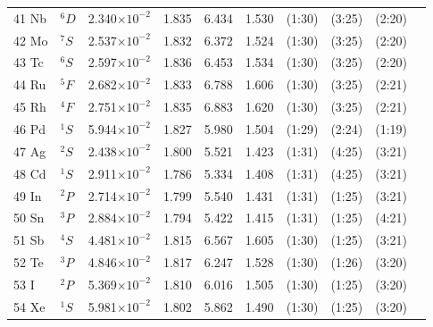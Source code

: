 \begin{longtable}{l l r r r r r r r r}
41 Nb 	&  	$^{6}D$   	&   	2.340$\times10^{-2}$   	&    	1.835    	&    	6.434    	&    	1.530    	&    	(1:30)    	&    	(3:25)    	&    	(2:20)   \\
42 Mo 	&  	$^{7}S$   	&   	2.537$\times10^{-2}$   	&    	1.832    	&    	6.372    	&    	1.524    	&    	(1:30)    	&    	(3:25)    	&    	(2:20)   \\
43 Tc 	&  	$^{6}S$   	&   	2.597$\times10^{-2}$   	&    	1.836    	&    	6.453    	&    	1.534    	&    	(1:30)    	&    	(3:25)    	&    	(2:20)   \\
44 Ru 	&  	$^{5}F$   	&   	2.682$\times10^{-2}$   	&    	1.833    	&    	6.788    	&    	1.606    	&    	(1:30)    	&    	(3:25)    	&    	(2:21)   \\
45 Rh 	&  	$^{4}F$   	&   	2.751$\times10^{-2}$   	&    	1.835    	&    	6.883    	&    	1.620    	&    	(1:30)    	&    	(3:25)    	&    	(2:21)   \\
46 Pd 	&  	$^{1}S$   	&   	5.944$\times10^{-2}$   	&    	1.827    	&    	5.980    	&    	1.504    	&    	(1:29)    	&    	(2:24)    	&    	(1:19)   \\
47 Ag 	&  	$^{2}S$   	&   	2.438$\times10^{-2}$   	&    	1.800    	&    	5.521    	&    	1.423    	&    	(1:31)    	&    	(4:25)    	&    	(3:21)   \\
48 Cd 	&  	$^{1}S$   	&   	2.911$\times10^{-2}$   	&   	1.786   	&   	5.334   	&   	1.408   	&   	(1:31)   	&    	(4:25)    	&    	(3:21)   \\
49 In 	&  	$^{2}P$   	&   	2.714$\times10^{-2}$   	&    	1.799    	&    	5.540    	&    	1.431    	&    	(1:31)    	&    	(1:25)    	&    	(3:21)   \\
50 Sn 	&  	$^{3}P$   	&   	2.884$\times10^{-2}$   	&    	1.794    	&    	5.422    	&    	1.415    	&    	(1:31)    	&    	(1:25)    	&    	(4:21)   \\
51 Sb 	&  	$^{4}S$   	&   	4.481$\times10^{-2}$   	&    	1.815    	&    	6.567    	&    	1.605    	&    	(1:30)    	&   	(1:25)   	&    	(3:21)   \\
52 Te 	&  	$^{3}P$   	&   	4.846$\times10^{-2}$   	&    	1.817    	&    	6.247    	&    	1.528    	&    	(1:30)    	&    	(1:26)    	&    	(3:20)   \\
53 I 		&  	$^{2}P$   	&   	5.369$\times10^{-2}$   	&    	1.810    	&    	6.016    	&    	1.505    	&    	(1:30)    	&    	(1:25)    	&    	(3:20)   \\
54 Xe 	&  	$^{1}S$   	&   	5.981$\times10^{-2}$   	&    	1.802    	&    	5.862    	&    	1.490    	&    	(1:30)    	&    	(1:25)    	&    	(3:20)   \\

\end{longtable}
